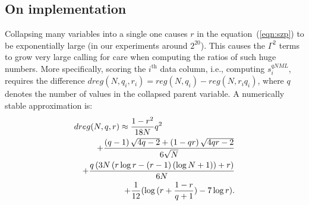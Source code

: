 \subsection{On implementation}

Collapsing many variables into a single one causes $r$ in the
equation~(\ref{eqn:szp}) to be exponentially large (in our experiments
around $2^{20}$).  This causes the $\Gamma^2$ terms to grow very large
calling for care when computing the ratios of such huge numbers. More
specifically, scoring the $i^\text{th}$ data column, i.e., computing
$s^{qNML}_i$, requires the difference $dreg(N,q_i,r_i)=reg(N,q_i) -
reg(N,r_i q_i)$, where $q$ denotes the number of values in the
collapsed parent variable.  A numerically stable approximation is:
\begin{eqnarray}
\lefteqn{dreg(N,q,r)\approx\frac{1-r^2}{18 N} q^{2}} \\
&&+ \frac{\left(q - 1\right) \sqrt{4 q - 2} + \left(1 - q r\right) \sqrt{4 q r - 2}}{6 \sqrt{N}} \nonumber\\
&&+\frac{q\left(3 N \left(r \log{r}  - \left(r - 1\right) \left(\log{N} + 1\right)\right) + r\right)}{6 N} \nonumber\\
&&+ \frac{1}{12}(\log{(r+\frac{1-r}{q+1})}- 7\log{r}).\nonumber
\end{eqnarray}

